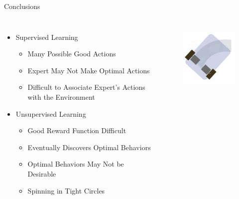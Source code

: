 \documentclass{beamer}
\begin{document}
	\begin{frame}{Conclusions}

		\begin{columns}[c c]


		\begin{itemize}
			\item Supervised Learning
				\begin{itemize}
					\item Many Possible Good Actions
					\item Expert May Not Make Optimal Actions
					\item Difficult to Associate Expert's Actions with the Environment
				\end{itemize}
			\item Unsupervised Learning
				\begin{itemize}
					\item Good Reward Function Difficult
					\item Eventually Discovers Optimal Behaviors
					\item Optimal Behaviors May Not be Desirable
					\item Spinning in Tight Circles
				\end{itemize}
		\end{itemize}


			\begin{figure}
				\includegraphics[width=\columnwidth]{differential.jpg}
				\label{diff_drive}
			\end{figure}

		\end{columns}

	\end{frame}
\end{document}
